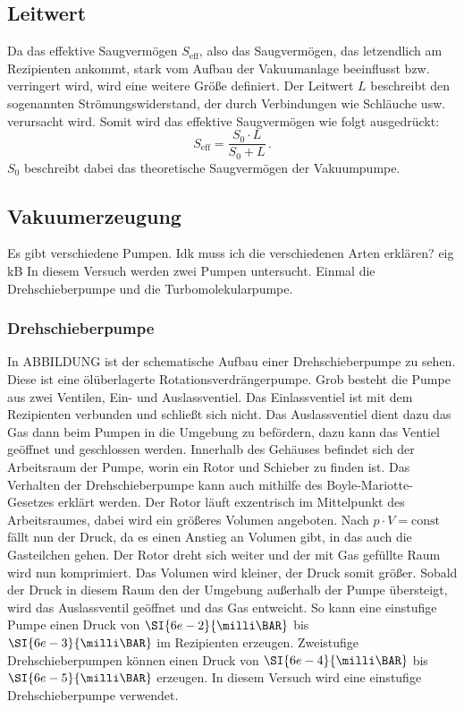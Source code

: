         \subsection{Leitwert}
            Da das effektive Saugvermögen $S_\text{eff}$, also das Saugvermögen, das letzendlich am Rezipienten ankommt, stark vom Aufbau der Vakuumanlage beeinflusst bzw. verringert wird, wird eine weitere Größe definiert.
            Der Leitwert $L$ beschreibt den sogenannten Strömungswiderstand, der durch Verbindungen wie Schläuche usw. verursacht wird.
            Somit wird das effektive Saugvermögen wie folgt ausgedrückt:
            \begin{equation*}
                S_\text{eff} = \frac{S_0 \cdot L}{S_0 + L} \, .
            \end{equation*}
            $S_0$ beschreibt dabei das theoretische Saugvermögen der Vakuumpumpe.


    \subsection{Vakuumerzeugung}
        Es gibt verschiedene Pumpen. Idk muss ich die verschiedenen Arten erklären? eig kB
        In diesem Versuch werden zwei Pumpen untersucht.
        Einmal die Drehschieberpumpe und die Turbomolekularpumpe.

        \subsubsection{Drehschieberpumpe}
            In ABBILDUNG ist der schematische Aufbau einer Drehschieberpumpe zu sehen.
            Diese ist eine ölüberlagerte Rotationsverdrängerpumpe.
            Grob besteht die Pumpe aus zwei Ventilen, Ein- und Auslassventiel.
            Das Einlassventiel ist mit dem Rezipienten verbunden und schließt sich nicht.
            Das Auslassventiel dient dazu das Gas dann beim Pumpen in die Umgebung zu befördern, dazu kann das Ventiel geöffnet und geschlossen werden.
            Innerhalb des Gehäuses befindet sich der Arbeitsraum der Pumpe, worin ein Rotor und Schieber zu finden ist.
            Das Verhalten der Drehschieberpumpe kann auch mithilfe des Boyle-Mariotte-Gesetzes erklärt werden.
            Der Rotor läuft exzentrisch im Mittelpunkt des Arbeitsraumes, dabei wird ein größeres Volumen angeboten.
            Nach $p \cdot V = \text{const}$ fällt nun der Druck, da es einen Anstieg an Volumen gibt, in das auch die Gasteilchen gehen.
            Der Rotor dreht sich weiter und der mit Gas gefüllte Raum wird nun komprimiert.
            Das Volumen wird kleiner, der Druck somit größer.
            Sobald der Druck in diesem Raum den der Umgebung außerhalb der Pumpe übersteigt, wird das Auslassventil geöffnet und das Gas entweicht.
            So kann eine einstufige Pumpe einen Druck von $\SI{6e-2}{\milli\BAR}$ bis $\SI{6e-3}{\milli\BAR}$ im Rezipienten erzeugen.
            Zweistufige Drehschieberpumpen können einen Druck von $\SI{6e-4}{\milli\BAR}$ bis $\SI{6e-5}{\milli\BAR}$ erzeugen.
            In diesem Versuch wird eine einstufige Drehschieberpumpe verwendet.


